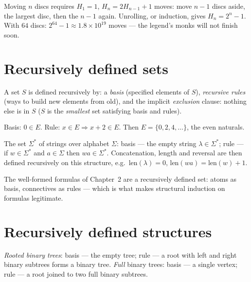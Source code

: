 \begin{example}\label{ex:hanoi}
Moving $n$ discs requires $H_1 = 1$, $H_n = 2H_{n-1} + 1$ moves: move
$n - 1$ discs aside, the largest disc, then the $n-1$ again. Unrolling, or
induction, gives $H_n = 2^{n} - 1$. With $64$ discs:
$2^{64} - 1 \approx 1.8 \times 10^{19}$ moves --- the legend's monks will
not finish soon.
\end{example}

\section{Recursively defined sets}

\begin{definition}
A set $S$ is defined recursively by: a \emph{basis} (specified elements of
$S$), \emph{recursive rules} (ways to build new elements from old), and the
implicit \emph{exclusion} clause: nothing else is in $S$ ($S$ is the
\emph{smallest} set satisfying basis and rules).
\end{definition}

\begin{example}
Basis: $0 \in E$. Rule: $x \in E \Rightarrow x + 2 \in E$. Then
$E = \{0, 2, 4, \ldots\}$, the even naturals.
\end{example}

\begin{example}[Strings]
The set $\Sigma^{*}$ of strings over alphabet $\Sigma$: basis --- the empty
string $\lambda \in \Sigma^{*}$; rule --- if $w \in \Sigma^{*}$ and
$a \in \Sigma$ then $wa \in \Sigma^{*}$. Concatenation, length and reversal
are then defined recursively on this structure, e.g.\
$\mathrm{len}(\lambda) = 0$, $\mathrm{len}(wa) = \mathrm{len}(w) + 1$.
\end{example}

\begin{example}
The well-formed formulas of Chapter~2 are a recursively defined set: atoms
as basis, connectives as rules --- which is what makes structural induction
on formulas legitimate.
\end{example}

\section{Recursively defined structures}

\begin{definition}
\emph{Rooted binary trees}: basis --- the empty tree; rule --- a root with
left and right binary subtrees forms a binary tree. \emph{Full} binary
trees: basis --- a single vertex; rule --- a root joined to two full binary
subtrees.
\end{definition}

